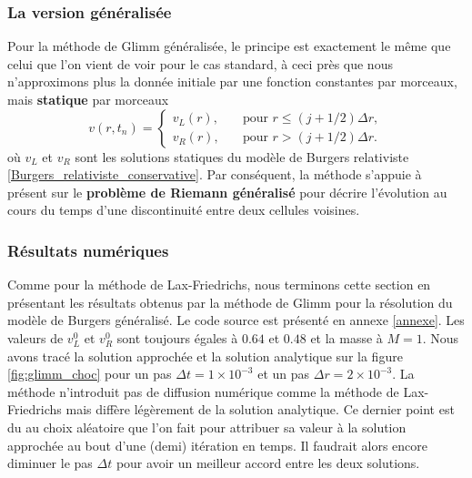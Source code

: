 \documentclass[11pt,a4paper]{article}
\begin{document}
\subsubsection{La version généralisée}

Pour la méthode de Glimm généralisée, le principe est exactement le même que celui que l'on vient de voir pour le cas standard, à ceci près que nous n'approximons plus la donnée initiale par une fonction constantes par morceaux, mais \textbf{statique} par morceaux
\begin{equation}
	v(r,t_n) = \left\{
	\begin{array}{rl}
	v_L(r), &\quad \text{pour } r\leq (j+ 1/2) \Delta r,\\
	v_R(r),&\quad \text{pour } r> (j+ 1/2) \Delta r.
	\end{array}
	\right.
\end{equation}
où $v_L$ et $v_R$ sont les solutions statiques du modèle de Burgers relativiste \eqref{Burgers_relativiste_conservative}. Par conséquent, la méthode s'appuie à présent sur le \textbf{problème de Riemann généralisé} pour décrire l'évolution au cours du temps d'une discontinuité entre deux cellules voisines.%

\subsubsection{Résultats numériques}

Comme pour la méthode de Lax-Friedrichs, nous terminons cette section en présentant les résultats obtenus  par la méthode de Glimm pour la résolution du modèle de Burgers généralisé. Le code source est présenté en annexe \ref{annexe}. Les valeurs de $v_L^0$ et $v_R^0$ sont toujours égales à $0.64$ et $0.48$ et la masse à $M=1$. Nous avons tracé la solution approchée et la solution analytique sur la figure \ref{fig:glimm_choc} pour un pas $\Delta t = 1\times 10^{-3}$ et un pas $\Delta r = 2\times 10^{-3}$.
La méthode n'introduit pas de diffusion numérique comme la méthode de Lax-Friedrichs mais diffère légèrement de la solution analytique. Ce dernier point est du au choix aléatoire que l'on fait pour attribuer sa valeur à la solution approchée au bout d'une (demi) itération en temps. Il faudrait alors encore diminuer le pas $\Delta t$ pour avoir un meilleur accord entre les deux solutions.
\end{document}
